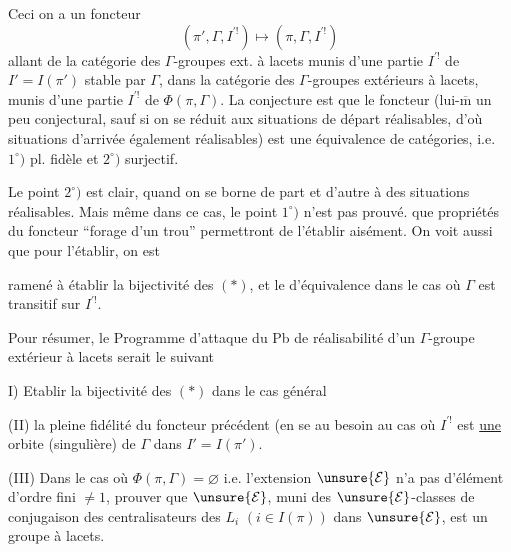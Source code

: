 
Ceci   on a  un foncteur
\[
(\pi',\Gamma,I^{\prime !})\longmapsto(\pi,\Gamma,I^{\prime !})
\]
allant de la catégorie des $\Gamma$-groupes ext. à lacets
 munis d'une partie $I^{\prime !}$ de $I'=I(\pi')$ stable
par $\Gamma$, dans la catégorie des $\Gamma$-groupes extérieurs à lacets, munis d'une partie $I^{\prime !}$ de
$\Phi(\pi,\Gamma)$. La conjecture est que le foncteur
(lui-$\overline{\mathrm m}$ un peu conjectural, sauf si on se réduit aux situations de départ réalisables, d'où situations d'arrivée également réalisables) est une équivalence de catégories, i.e. $1^\circ)$ pl. fidèle et $2^\circ)$  surjectif. 

Le point $2^\circ)$ est clair, quand on se borne de part et d'autre à des situations réalisables. Mais même dans ce cas, le point $1^\circ)$ n'est pas prouvé.
  que
propriétés du foncteur ``forage d'un trou'' permettront de l'établir aisément. On voit aussi que pour l'établir, on est


ramené à établir la bijectivité des $(*)$, et le  d'équivalence dans le cas où $\Gamma$ est transitif sur $I^{\prime !}$.

Pour résumer, le Programme d'attaque du Pb de réalisabilité d'un $\Gamma$-groupe extérieur à lacets serait le suivant

I) Etablir la bijectivité des $(*)$ dans le cas général

(II)  la pleine fidélité du foncteur précédent (en se  au besoin au cas où $I^{\prime !}$ est \uline{une} orbite (singulière) de $\Gamma$ dans $I'=I(\pi')$.

(III) Dans le cas où $\Phi(\pi,\Gamma)=\varnothing$ i.e. l'extension $\unsure{\mathcal E}$ n'a pas d'élément d'ordre fini $\ne1$, prouver que $\unsure{\mathcal E}$, muni  des $\unsure{\mathcal E}$-classes de conjugaison des centralisateurs des $L_i$ $(i\in I(\pi))$ dans $\unsure{\mathcal E}$, est un groupe à lacets.


